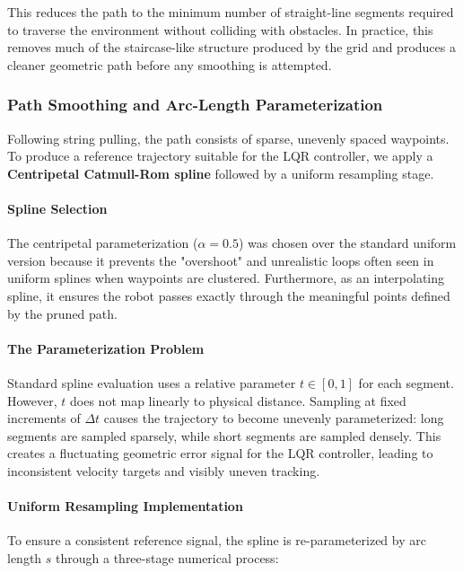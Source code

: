 \documentclass[11pt]{article}
\begin{document}
This reduces the path to the minimum number of straight-line segments required to traverse the environment without
colliding with obstacles. In practice, this removes much of the staircase-like structure produced by the grid and
produces a cleaner geometric path before any smoothing is attempted.

\subsubsection{Path Smoothing and Arc-Length Parameterization}

Following string pulling, the path consists of sparse, unevenly spaced waypoints. To produce a reference trajectory
suitable for the LQR controller, we apply a \textbf{Centripetal Catmull-Rom spline} followed by a uniform resampling
stage.

\paragraph{Spline Selection}
The centripetal parameterization ($\alpha = 0.5$) was chosen over the standard uniform version because it prevents the
"overshoot" and unrealistic loops often seen in uniform splines when waypoints are clustered. Furthermore, as an
interpolating spline, it ensures the robot passes exactly through the meaningful points defined by the pruned
path.

\paragraph{The Parameterization Problem}
Standard spline evaluation uses a relative parameter $t \in [0,1]$ for each segment. However, $t$ does not map linearly
to physical distance. Sampling at fixed increments of $\Delta t$ causes the trajectory to become unevenly parameterized:
long segments are sampled sparsely, while short segments are sampled densely. This creates a fluctuating geometric error
signal for the LQR controller, leading to inconsistent velocity targets and visibly uneven tracking.

\paragraph{Uniform Resampling Implementation}
To ensure a consistent reference signal, the spline is re-parameterized by arc length $s$ through a three-stage
numerical process:
\end{document}
